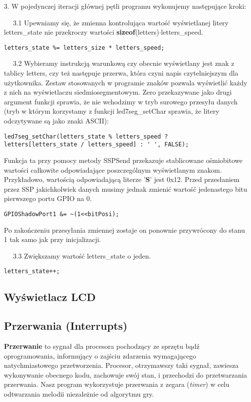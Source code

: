 \documentclass[a4paper,12pt,twoside]{article}
\theoremstyle{plain}
\theoremstyle{definition}
\theoremstyle{remark}
\begin{document}
3. W pojedynczej iteracji głównej pętli programu wykonujemy następujące kroki:

$\quad$ 3.1 Upewniamy się, że zmienna kontrolująca wartość wyświetlanej litery letters\_state nie przekroczy wartości \textbf{sizeof}(letters)$\cdot$letters\_speed.
\begin{verbatim}
letters_state %= letters_size * letters_speed;
\end{verbatim}

$\quad$ 3.2 Wybieramy instrukcją warunkową czy obecnie wyświetlany jest znak z tablicy letters, czy też następuje przerwa, która czyni napis czytelniejszym dla użytkownika. Zestaw stosowanych w programie znaków pozwala wyświetlić każdy z nich na wyświetlaczu siedmiosegmentowym. Zero przekazywane jako drugi argument funkcji sprawia, że nie wchodzimy w tryb surowego przesyłu danych (tryb w którym korzystamy z funkcji led7seg\_setChar sprawia, że litery odczytywane są jako znaki ASCII):
\begin{verbatim}
led7seg_setChar(letters_state % letters_speed ?
letters[letters_state / letters_speed] : ' ', FALSE);
\end{verbatim}
Funkcja ta przy pomocy metody SSPSend przekazuje stablicowane ośmiobitowe wartości całkowite odpowiadające poszczególnym wyświetlanym znakom. Przykładowo, wartością odpowiadającą literze '\textbf{S}' jest 0x12. Przed przesłaniem przez SSP jakichkolwiek danych musimy jednak zmienić wartość jedenastego bitu pierwszego portu GPIO na 0. 
\begin{verbatim}
GPIOShadowPort1 &= ~(1<<bitPosi);
\end{verbatim}
Po zakończeniu przesyłania zmiennej zostaje on ponownie przywrócony do stanu 1 tak samo jak przy inicjalizacji.

$\quad$ 3.3 Zwiększamy wartość letters\_state o jeden.
\begin{verbatim}
letters_state++;
\end{verbatim}
\subsection{Wyświetlacz LCD}

\subsection{Przerwania (Interrupts)}

\textbf{Przerwanie} to sygnał dla procesora pochodzący ze sprzętu bądź oprogramowania, informujący o zajściu zdarzenia wymagającego natychmiastowego przetworzenia. Procesor, otrzymawszy taki sygnał, zawiesza wykonywanie obecnego kodu, zachowuje swój stan, i przechodzi do przetwarzania przerwania. Nasz program wykorzystuje przerwania z zegara (\textit{timer}) w celu odtwarzania melodii niezależnie od algorytmu gry.
\end{document}
